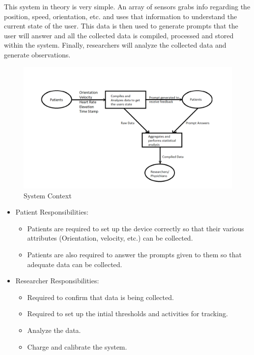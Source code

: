 \documentclass[12pt]{article}
\begin{document}
This system in theory is very simple. An array of sensors grabs info regarding the position, speed, orientation, etc. and uses that information to understand the current state of the user. This data is then used to generate prompts that the user will answer and all the collected data is compiled, processed and stored within the system. Finally, researchers will analyze the collected data and generate observations. 
\begin{figure}[h!]

\begin{center}
 \includegraphics[width=.95\textwidth]{System Context Diagram}
\caption{System Context}
\label{Fig_SystemContext} 
\end{center}
\end{figure}


\begin{itemize}

\item Patient Responsibilities:
\begin{itemize}
\item Patients are required to set up the device correctly so that their various attributes (Orientation, velocity, etc.) can be collected.
\item Patients are also required to answer the prompts given to them so that adequate data can be collected.
\end{itemize}
\item Researcher Responsibilities:
\begin{itemize}
\item Required to confirm that data is being collected.
\item Required to set up the intial thresholds and activities for tracking.
\item Analyze the data.
\item Charge and calibrate the system.
\end{itemize}
\end{itemize}
\end{document}
